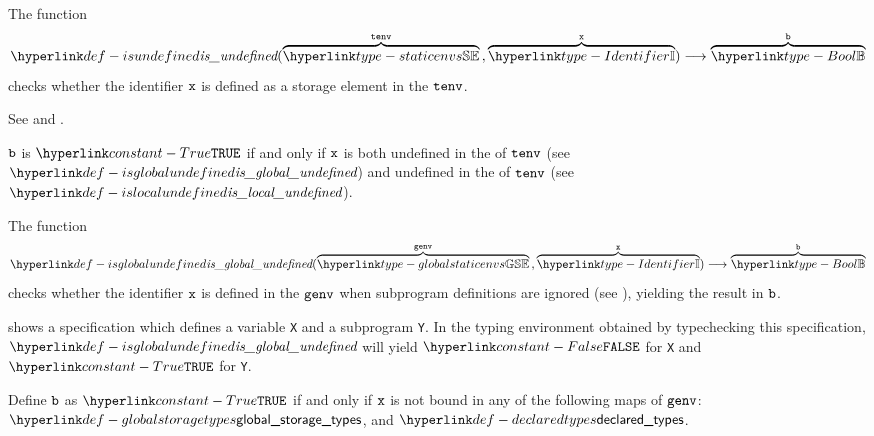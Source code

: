 \hypertarget{def-isundefined}{}
The function
\[
\isundefined(\overname{\staticenvs}{\tenv} \aslsep \overname{\Identifier}{\vx})
\aslto \overname{\Bool}{\vb}
\]
checks whether the identifier $\vx$ is defined as a storage element in the \staticenvironmentterm{} $\tenv$.

See  and
.

\ProseParagraph
$\vb$ is $\True$ if and only if $\vx$ is both undefined in the \globalstaticenvironmentterm{} of $\tenv$
(see $\isglobalundefined$) and undefined in the \localstaticenvironmentterm{} of $\tenv$ (see $\islocalundefined$).

\FormallyParagraph
\begin{mathpar}
\end{mathpar}

\hypertarget{def-isglobalundefined}{}
The function
\[
\isglobalundefined(\overname{\globalstaticenvs}{\genv} \aslsep \overname{\Identifier}{\vx}) \aslto \overname{\Bool}{\vb}
\]
checks whether the identifier $\vx$ is defined in the \globalstaticenvironmentterm{} $\genv$ when subprogram definitions are ignored (see ), yielding the result in $\vb$.

 shows a specification which defines a variable \verb|X| and a subprogram \verb|Y|.
In the typing environment obtained by typechecking this specification, $\isglobalundefined$ will yield $\False$ for \verb|X| and $\True$ for \verb|Y|.

\ProseParagraph
Define $\vb$ as $\True$ if and only if $\vx$ is not bound in any of the following maps of $\genv$:
$\globalstoragetypes$, and $\declaredtypes$.
\FormallyParagraph
\begin{mathpar}
\end{mathpar}

